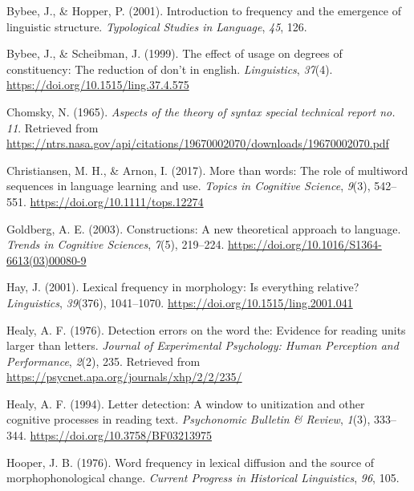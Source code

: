 \documentclass[
  man,floatsintext]{apa6}
\newlength{\cslhangindent}
\newlength{\cslentryspacingunit} %
\newenvironment{CSLReferences}[2] %
 {%
  \setlength{\parindent}{0pt}
  \ifodd #1
  \let\oldpar\par
  \def\par{\hangindent=\cslhangindent\oldpar}
  \fi
  \setlength{\parskip}{#2\cslentryspacingunit}
 }%
 {}
\begin{document}
\begin{CSLReferences}{1}{0}
\leavevmode{}%
Bybee, J., \& Hopper, P. (2001). Introduction to frequency and the emergence of linguistic structure. \emph{Typological Studies in Language}, \emph{45}, 126.

\leavevmode{}%
Bybee, J., \& Scheibman, J. (1999). The effect of usage on degrees of constituency: The reduction of don't in english. \emph{Linguistics}, \emph{37}(4). \url{https://doi.org/10.1515/ling.37.4.575}

\leavevmode{}%
Chomsky, N. (1965). \emph{Aspects of the theory of syntax special technical report no. 11}. Retrieved from \url{https://ntrs.nasa.gov/api/citations/19670002070/downloads/19670002070.pdf}

\leavevmode{}%
Christiansen, M. H., \& Arnon, I. (2017). More than words: The role of multiword sequences in language learning and use. \emph{Topics in Cognitive Science}, \emph{9}(3), 542--551. \url{https://doi.org/10.1111/tops.12274}

\leavevmode{}%
Goldberg, A. E. (2003). Constructions: A new theoretical approach to language. \emph{Trends in Cognitive Sciences}, \emph{7}(5), 219--224. \url{https://doi.org/10.1016/S1364-6613(03)00080-9}

\leavevmode{}%
Hay, J. (2001). Lexical frequency in morphology: Is everything relative? \emph{Linguistics}, \emph{39}(376), 1041--1070. \url{https://doi.org/10.1515/ling.2001.041}

\leavevmode{}%
Healy, A. F. (1976). Detection errors on the word the: Evidence for reading units larger than letters. \emph{Journal of Experimental Psychology: Human Perception and Performance}, \emph{2}(2), 235. Retrieved from \url{https://psycnet.apa.org/journals/xhp/2/2/235/}

\leavevmode{}%
Healy, A. F. (1994). Letter detection: A window to unitization and other cognitive processes in reading text. \emph{Psychonomic Bulletin \& Review}, \emph{1}(3), 333--344. \url{https://doi.org/10.3758/BF03213975}

\leavevmode{}%
Hooper, J. B. (1976). Word frequency in lexical diffusion and the source of morphophonological change. \emph{Current Progress in Historical Linguistics}, \emph{96}, 105.


\end{CSLReferences}
\end{document}
